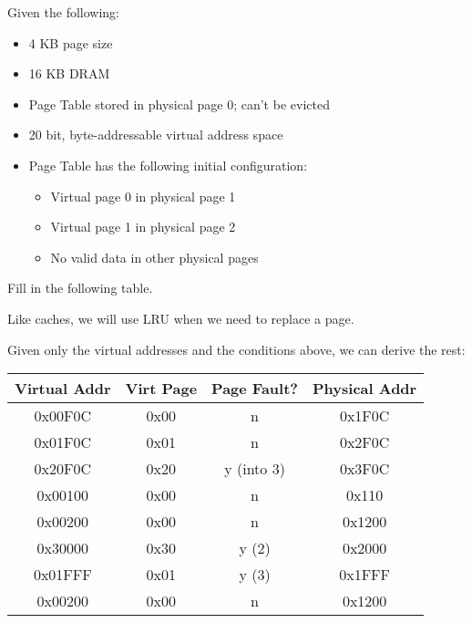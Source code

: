 \begin{problem}
  Given the following:
  \begin{itemize}
    \item 4 KB page size
    \item 16 KB DRAM
    \item Page Table stored in physical page 0; can't be evicted
    \item 20 bit, byte-addressable virtual address space
    \item Page Table has the following initial configuration:
    \begin{itemize}
      \item Virtual page 0 in physical page 1
      \item Virtual page 1 in physical page 2
      \item No valid data in other physical pages
    \end{itemize}
  \end{itemize}
  Fill in the following table.
  \begin{remark}
    Like caches, we will use LRU when we need to replace a page.
  \end{remark}
\end{problem}
\begin{answer}
  Given only the virtual addresses and the conditions above, we can derive the rest: \\
  \begin{center}
    \begin{tabular}{|c|c|c|c|}
      \hline
      Virtual Addr & Virt Page & Page Fault? & Physical Addr \\
      \hline
      0x00F0C & 0x00 & n & 0x1F0C \\
      0x01F0C & 0x01 & n & 0x2F0C \\
      0x20F0C & 0x20 & y (into 3) & 0x3F0C \\
      0x00100 & 0x00 & n & 0x110 \\
      0x00200 & 0x00 & n & 0x1200 \\
      0x30000 & 0x30 & y (2) & 0x2000 \\
      0x01FFF & 0x01 & y (3) & 0x1FFF \\
      0x00200 & 0x00 & n & 0x1200 \\
      \hline
    \end{tabular}
  \end{center}
\end{answer}
